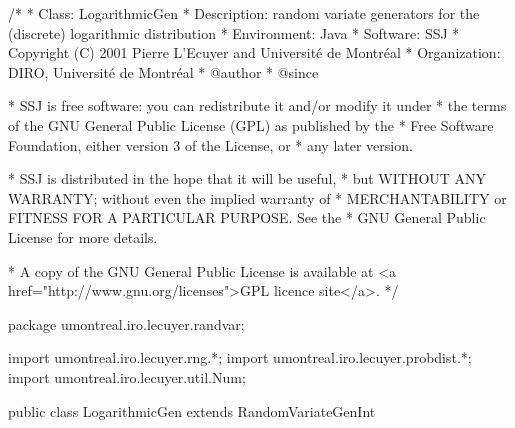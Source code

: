 \begin{code}
\begin{hide}
/*
 * Class:        LogarithmicGen
 * Description:  random variate generators for the (discrete) logarithmic distribution
 * Environment:  Java
 * Software:     SSJ 
 * Copyright (C) 2001  Pierre L'Ecuyer and Université de Montréal
 * Organization: DIRO, Université de Montréal
 * @author       
 * @since

 * SSJ is free software: you can redistribute it and/or modify it under
 * the terms of the GNU General Public License (GPL) as published by the
 * Free Software Foundation, either version 3 of the License, or
 * any later version.

 * SSJ is distributed in the hope that it will be useful,
 * but WITHOUT ANY WARRANTY; without even the implied warranty of
 * MERCHANTABILITY or FITNESS FOR A PARTICULAR PURPOSE.  See the
 * GNU General Public License for more details.

 * A copy of the GNU General Public License is available at
   <a href="http://www.gnu.org/licenses">GPL licence site</a>.
 */
\end{hide}
package umontreal.iro.lecuyer.randvar;\begin{hide}
import umontreal.iro.lecuyer.rng.*;
import umontreal.iro.lecuyer.probdist.*;
import umontreal.iro.lecuyer.util.Num;
\end{hide}

public class LogarithmicGen extends RandomVariateGenInt \begin{hide} {
   private static final double default_theta_limit = 0.96;

   private double theta_limit = default_theta_limit;
   private double theta;
   private double t;      // = log (1.0-theta).
   private double h;      // = -theta/log (1.0-theta).
\end{hide}
\end{code}


